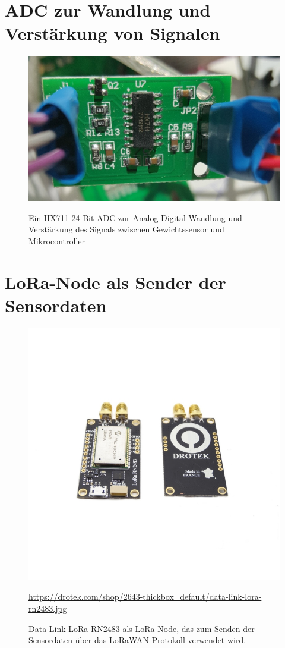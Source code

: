 \section{ADC zur Wandlung und Verstärkung von Signalen}
\begin{figure}[H]
    \center
    \includegraphics[width=14cm]{Bilder/gewichtssensor.jpg}\\
    \caption{Ein HX711 24-Bit ADC zur Analog-Digital-Wandlung und Verstärkung des Signals zwischen Gewichtssensor und Mikrocontroller}
    \label{fig:Gewichtssensor}
\end{figure}
\newpage
\section{LoRa-Node als Sender der Sensordaten}
\begin{figure}[H]
    \center
    \includegraphics[width=14cm]{Bilder/lora-node.jpg}\\
    \caption{Data Link LoRa RN2483 als LoRa-Node, das zum Senden der Sensordaten über das LoRaWAN-Protokoll verwendet wird.}
    \begin{flushleft}
        \quelle\url{https://drotek.com/shop/2643-thickbox_default/data-link-lora-rn2483.jpg}
    \end{flushleft}
    \label{fig:Lora-Node}
\end{figure}

